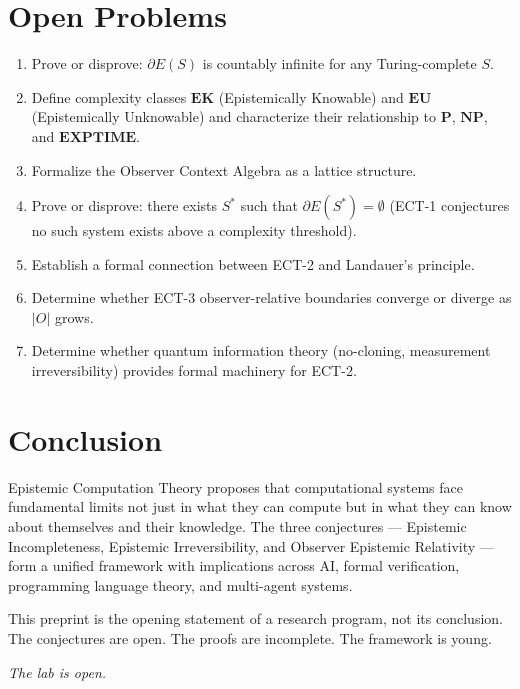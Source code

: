 \documentclass[12pt]{article}
\theoremstyle{definition}
\newcommand{\EB}{\partial E(S)}
\begin{document}
\section{Open Problems}

\begin{enumerate}[leftmargin=1.5em]
  \item Prove or disprove: $\EB$ is countably infinite for any Turing-complete $S$.
  \item Define complexity classes $\mathbf{EK}$ (Epistemically Knowable) and $\mathbf{EU}$ (Epistemically Unknowable) and characterize their relationship to $\mathbf{P}$, $\mathbf{NP}$, and $\mathbf{EXPTIME}$.
  \item Formalize the Observer Context Algebra as a lattice structure.
  \item Prove or disprove: there exists $S^*$ such that $\partial E(S^*) = \emptyset$ (ECT-1 conjectures no such system exists above a complexity threshold).
  \item Establish a formal connection between ECT-2 and Landauer's principle.
  \item Determine whether ECT-3 observer-relative boundaries converge or diverge as $|O|$ grows.
  \item Determine whether quantum information theory (no-cloning, measurement irreversibility) provides formal machinery for ECT-2.
\end{enumerate}

\section{Conclusion}

Epistemic Computation Theory proposes that computational systems face fundamental limits not just in what they can compute but in what they can know about themselves and their knowledge. The three conjectures --- Epistemic Incompleteness, Epistemic Irreversibility, and Observer Epistemic Relativity --- form a unified framework with implications across AI, formal verification, programming language theory, and multi-agent systems.

This preprint is the opening statement of a research program, not its conclusion. The conjectures are open. The proofs are incomplete. The framework is young.

\medskip
\noindent\textit{The lab is open.}
\end{document}
